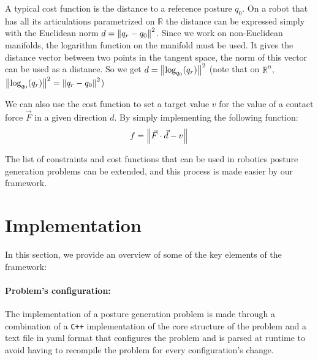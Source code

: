 A typical cost function is the distance to a reference posture $q_0$.
On a robot that has all its articulations parametrized on $\mathbb{R}$ the distance can be expressed simply with the Euclidean norm $d = \left\| q_r-q_0 \right\|^2$.
Since we work on non-Euclidean manifolds, the logarithm function on the manifold must be used.
It gives the distance vector between two points in the tangent space, the norm of this vector can be used as a distance.
So we get $d = \left\| \text{log}_{q_0}(q_r) \right\|^2$ (note that on $\mathbb{R}^n$, $\left\| \text{log}_{q_0}(q_r) \right\|^2 = \left\| q_r - q_0 \right\|^2$)

We can also use the cost function to set a target value $v$ for the value of a contact force $\vec{F}$ in a given direction $d$. By simply implementing the following function:
\begin{equation}
  f = \left\| \vec{F}\cdot\vec{d}-v \right\|
\end{equation}

The list of constraints and cost functions that can be used in robotics posture generation problems can be extended, and this process is made easier by our framework.



\section{Implementation}
\label{sec:implementation}

In this section, we provide an overview of some of the key elements of the framework:

\paragraph{Problem's configuration:}
The implementation of a posture generation problem is made through a combination of a \texttt{C++} implementation of the core structure of the problem and a text file in yaml format that configures the problem and is parsed at runtime to avoid having to recompile the problem for every configuration's change.

